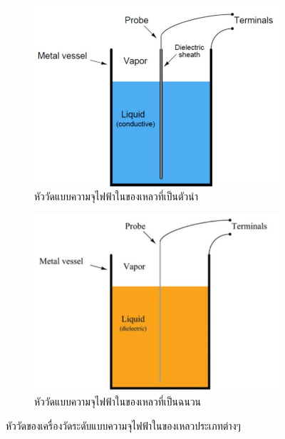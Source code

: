 \documentclass[final,11pt]{article}
\begin{document}
\begin{figure}[h]
    \begin{subfigure}[b]{0.48\textwidth}
        \centering
        \includegraphics[width=\textwidth]{images/Screenshot_24.jpg}
        \caption{หัววัดแบบความจุไฟฟ้าในของเหลวที่เป็นตัวนำ}
        \label{fig:cld1}
    \end{subfigure}
    \hfill
    \begin{subfigure}[b]{0.48\textwidth}
        \centering
        \includegraphics[width=\textwidth]{images/Screenshot_25.jpg}
        \caption{หัววัดแบบความจุไฟฟ้าในของเหลวที่เป็นฉนวน}
        \label{fig:cld2}
    \end{subfigure}
    \hfill
    \caption{หัววัดของเครื่องวัดระดับแบบความจุไฟฟ้าในของเหลวประเภทต่างๆ}
    \label{fig:cld}
\end{figure}
\end{document}
